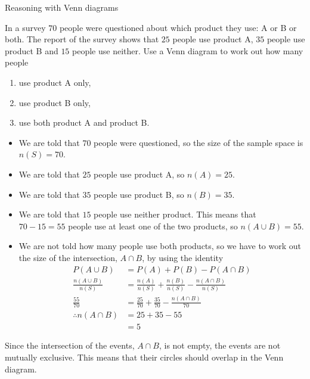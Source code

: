 \begin{wex}{Reasoning with Venn diagrams}
{In a survey $70$ people were questioned about which product they
  use: A or B or both. The report of the survey shows that $25$
  people use product A, $35$ people use product B and $15$ people use
  neither. Use a Venn diagram to work out how many people
  \begin{enumerate}[itemsep=5pt, label=\textbf{\arabic*}. ]
  \item use product A only,
  \item use product B only,
  \item use both product A and product B.
  \end{enumerate}
}{
  \begin{itemize}
  \item We are told that $70$ people were questioned, so the size of the
    sample space is $n(S) = 70$.
  \item We are told that $25$ people use product A, so $n(A) = 25$.
  \item We are told that $35$ people use product B, so $n(B) = 35$.
  \item We are told that $15$ people use neither product. This means
    that $70-15=55$ people use at least one of the two products, so
    $n(A \cup B) = 55$.
  \item We are not told how many people use both products, so we have
    to work out the size of the intersection, $A \cap B$, by using the
    identity
    \begin{align*}
      P(A \cup B) &= P(A) + P(B) - P(A \cap B) \\
      \frac{n(A \cup B)}{n(S)} &= \frac{n(A)}{n(S)} + \frac{n(B)}{n(S)} - \frac{n(A \cap B)}{n(S)} \\
      \frac{55}{70} &= \frac{25}{70} + \frac{35}{70} - \frac{n(A \cap B)}{70} \\
      \therefore n(A \cap B) &= 25 + 35 - 55 \\
      &= 5
    \end{align*}
  \end{itemize}

  Since the intersection of the events, $A \cap B$, is not empty, the
  events are not mutually exclusive. This means that their circles
  should overlap in the Venn diagram.

}
\end{wex}

